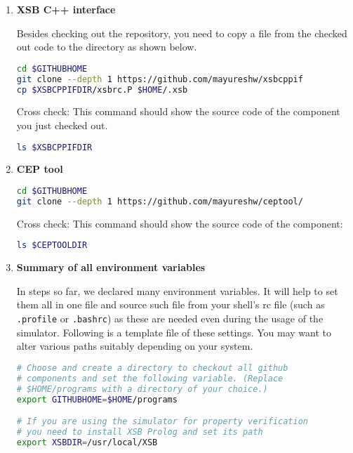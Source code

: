 \documentclass[12pt,a4paper]{article}
\begin{document}
\begin{enumerate}
\item \textbf{XSB C++ interface}

Besides checking out the repository, you need to copy a file from the checked out code to the directory as shown below.

\begin{lstlisting}[language=bash,style=snippet]
cd $GITHUBHOME
git clone --depth 1 https://github.com/mayureshw/xsbcppif
cp $XSBCPPIFDIR/xsbrc.P $HOME/.xsb
\end{lstlisting}

Cross check: This command should show the source code of the component you just checked out.

\begin{lstlisting}[language=bash,style=snippet]
ls $XSBCPPIFDIR
\end{lstlisting}

\item \textbf{CEP tool}

\begin{lstlisting}[language=bash,style=snippet]
cd $GITHUBHOME
git clone --depth 1 https://github.com/mayureshw/ceptool/
\end{lstlisting}

Cross check: This command should show the source code of the component:

\begin{lstlisting}[language=bash,style=snippet]
ls $CEPTOOLDIR
\end{lstlisting}

\item \textbf{Summary of all environment variables}

In steps so far, we declared many environment variables. It will help to set them all in one file and source such file from your shell's rc file (such as \texttt{.profile} or \texttt{.bashrc}) as these are needed even during the usage of the simulator. Following is a template file of these settings. You may want to alter various paths suitably depending on your system.

\begin{lstlisting}[language=bash,style=snippet]
# Choose and create a directory to checkout all github
# components and set the following variable. (Replace
# $HOME/programs with a directory of your choice.)
export GITHUBHOME=$HOME/programs

# If you are using the simulator for property verification
# you need to install XSB Prolog and set its path
export XSBDIR=/usr/local/XSB


\end{lstlisting}
\end{enumerate}
\end{document}

